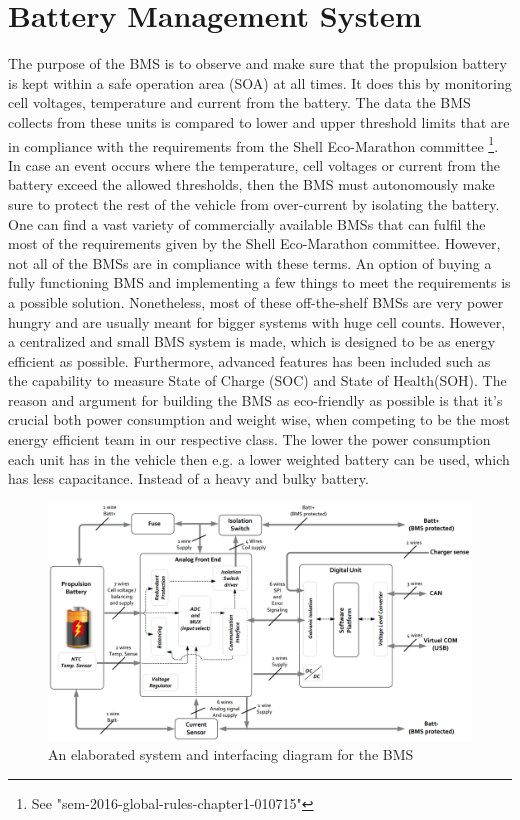 \section{Battery Management System}
\label{sec:BMSHWChapter}
The purpose of the BMS is to observe and make sure that the propulsion battery is kept within a safe operation area (SOA) at all times. It does this by monitoring cell voltages, temperature and current from the battery. The data the BMS collects from these units is compared to lower and upper threshold limits that are in compliance with the requirements from the Shell Eco-Marathon committee \footnote{See "sem-2016-global-rules-chapter1-010715"}. In case an event occurs where the temperature, cell voltages or current from the battery exceed the allowed thresholds, then the BMS must autonomously make sure to protect the rest of the vehicle from over-current by isolating the battery. \\
One can find a vast variety of commercially available BMSs that can fulfil the most of the requirements given by the Shell Eco-Marathon committee. However, not all of the BMSs are in compliance with these terms. An option of buying a fully functioning BMS and implementing a few things to meet the requirements is a possible solution. Nonetheless, most of these off-the-shelf BMSs are very power hungry and are usually meant for bigger systems with huge cell counts. However, a centralized and small BMS system is made, which is designed to be as energy efficient as possible. Furthermore, advanced features has been included such as the capability to measure State of Charge (SOC) and State of Health(SOH). The reason and argument for building the BMS as eco-friendly as possible is that it's crucial both power consumption and weight wise, when competing to be the most energy efficient team in our respective class. The lower the power consumption each unit has in the vehicle then e.g. a lower weighted battery can be used, which has less capacitance. Instead of a heavy and bulky battery.\\

\begin{figure}[H]
	\centering
	\includegraphics[width=1.0\linewidth]{Hardware/Pictures/BMSOverview}
	\caption[Empty]{An elaborated system and interfacing diagram for the BMS\footnotemark}
	\label{fig:BMSOverview}
\end{figure}

